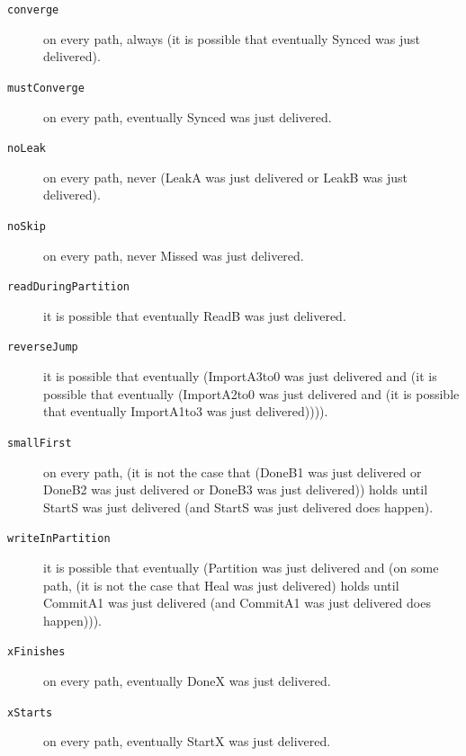 \begin{description}
\item[\texttt{converge}] on every path, always (it is possible that eventually Synced was just delivered).
\item[\texttt{mustConverge}] on every path, eventually Synced was just delivered.
\item[\texttt{noLeak}] on every path, never (LeakA was just delivered or LeakB was just delivered).
\item[\texttt{noSkip}] on every path, never Missed was just delivered.
\item[\texttt{readDuringPartition}] it is possible that eventually ReadB was just delivered.
\item[\texttt{reverseJump}] it is possible that eventually (ImportA3to0 was just delivered and (it is possible that eventually (ImportA2to0 was just delivered and (it is possible that eventually ImportA1to3 was just delivered)))).
\item[\texttt{smallFirst}] on every path, (it is not the case that (DoneB1 was just delivered or DoneB2 was just delivered or DoneB3 was just delivered)) holds until StartS was just delivered (and StartS was just delivered does happen).
\item[\texttt{writeInPartition}] it is possible that eventually (Partition was just delivered and (on some path, (it is not the case that Heal was just delivered) holds until CommitA1 was just delivered (and CommitA1 was just delivered does happen))).
\item[\texttt{xFinishes}] on every path, eventually DoneX was just delivered.
\item[\texttt{xStarts}] on every path, eventually StartX was just delivered.
\end{description}
